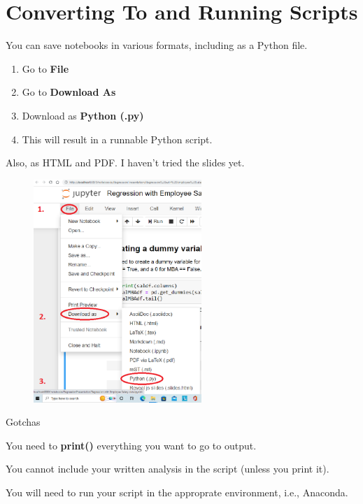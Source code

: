 \documentclass{beamer}
\begin{document}
\section{Converting To and Running Scripts}

    You can save notebooks in various formats, including as a Python file.

    \begin{enumerate}
            \setlength\itemsep{1em}
        \item Go to \textbf{File}
        \item Go to \textbf{Download As}
        \item Download as \textbf{Python (.py)}
        \item This will result in a runnable Python script.
    \end{enumerate}

    Also, as HTML and PDF. I haven't tried the slides yet.


\begin{frame}
   \begin{figure}[!ht]
        \begin{center}
            \includegraphics[width=2.5in]{DownloadAsPython.png}
        \end{center}
    \end{figure} 
\end{frame}

\begin{frame}
    \LARGE Gotchas

    \normalsize
    You need to \textbf{print()} everything you want to go to output.

    You cannot include your written analysis in the script (unless you print it).

    You will need to run your script in the approprate environment, i.e., Anaconda.
    
\end{frame}
\end{document}
